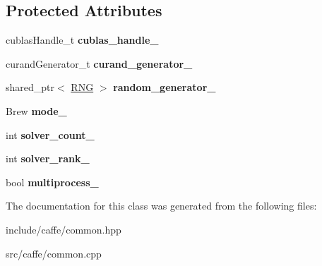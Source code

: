\subsection*{Protected Attributes}
\begin{DoxyCompactItemize}
\item 
cublas\+Handle\+\_\+t {\bfseries cublas\+\_\+handle\+\_\+}\hypertarget{classcaffe_1_1Caffe_a5fb5298203759722a061644b508ddaeb}{}\label{classcaffe_1_1Caffe_a5fb5298203759722a061644b508ddaeb}

\item 
curand\+Generator\+\_\+t {\bfseries curand\+\_\+generator\+\_\+}\hypertarget{classcaffe_1_1Caffe_a0d920ccea7282d5d88335847c0e9ca9e}{}\label{classcaffe_1_1Caffe_a0d920ccea7282d5d88335847c0e9ca9e}

\item 
shared\+\_\+ptr$<$ \hyperlink{classcaffe_1_1Caffe_1_1RNG}{R\+NG} $>$ {\bfseries random\+\_\+generator\+\_\+}\hypertarget{classcaffe_1_1Caffe_a0c1d6159f6add0ae470af9a09836d979}{}\label{classcaffe_1_1Caffe_a0c1d6159f6add0ae470af9a09836d979}

\item 
Brew {\bfseries mode\+\_\+}\hypertarget{classcaffe_1_1Caffe_aef998c6b69827060630e21a8ccf8884e}{}\label{classcaffe_1_1Caffe_aef998c6b69827060630e21a8ccf8884e}

\item 
int {\bfseries solver\+\_\+count\+\_\+}\hypertarget{classcaffe_1_1Caffe_afc26b38d30812df267645c4a94135a74}{}\label{classcaffe_1_1Caffe_afc26b38d30812df267645c4a94135a74}

\item 
int {\bfseries solver\+\_\+rank\+\_\+}\hypertarget{classcaffe_1_1Caffe_a00152204105cd59b691d8bda828664b5}{}\label{classcaffe_1_1Caffe_a00152204105cd59b691d8bda828664b5}

\item 
bool {\bfseries multiprocess\+\_\+}\hypertarget{classcaffe_1_1Caffe_a25bdfb72baf0bfc5fca31579b08d2b6f}{}\label{classcaffe_1_1Caffe_a25bdfb72baf0bfc5fca31579b08d2b6f}

\end{DoxyCompactItemize}


The documentation for this class was generated from the following files\+:\begin{DoxyCompactItemize}
\item 
include/caffe/common.\+hpp\item 
src/caffe/common.\+cpp\end{DoxyCompactItemize}

